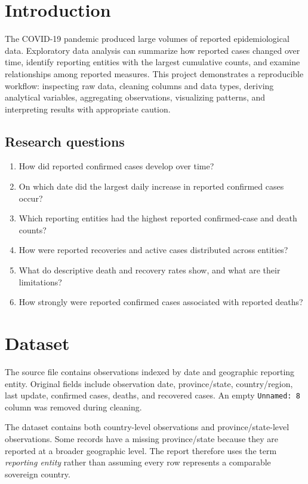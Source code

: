 \documentclass[11pt,a4paper]{article}
\begin{document}
\section{Introduction}
The COVID-19 pandemic produced large volumes of reported epidemiological data. Exploratory data analysis can summarize how reported cases changed over time, identify reporting entities with the largest cumulative counts, and examine relationships among reported measures. This project demonstrates a reproducible workflow: inspecting raw data, cleaning columns and data types, deriving analytical variables, aggregating observations, visualizing patterns, and interpreting results with appropriate caution.

\subsection{Research questions}
\begin{enumerate}
\item How did reported confirmed cases develop over time?
\item On which date did the largest daily increase in reported confirmed cases occur?
\item Which reporting entities had the highest reported confirmed-case and death counts?
\item How were reported recoveries and active cases distributed across entities?
\item What do descriptive death and recovery rates show, and what are their limitations?
\item How strongly were reported confirmed cases associated with reported deaths?
\end{enumerate}

\section{Dataset}
The source file contains observations indexed by date and geographic reporting entity. Original fields include observation date, province/state, country/region, last update, confirmed cases, deaths, and recovered cases. An empty \texttt{Unnamed: 8} column was removed during cleaning.

The dataset contains both country-level observations and province/state-level observations. Some records have a missing province/state because they are reported at a broader geographic level. The report therefore uses the term \emph{reporting entity} rather than assuming every row represents a comparable sovereign country.
\end{document}
